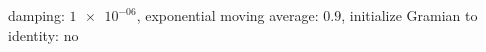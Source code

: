 damping: $\num[scientific-notation=true]{1e-06}$, exponential moving average: $\num[scientific-notation=true]{0.9}$, initialize Gramian to identity: $\text{no}$
